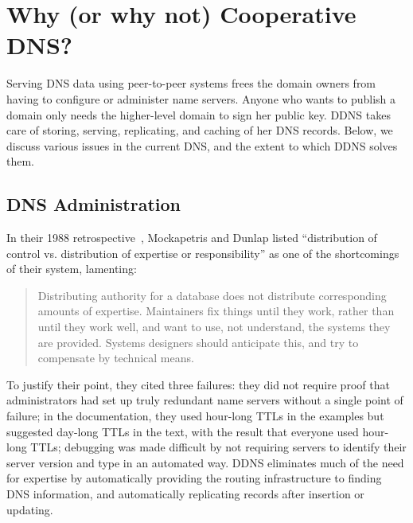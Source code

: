 \section{Why (or why not) Cooperative DNS?}

Serving DNS data using peer-to-peer systems 
frees the domain owners from having to configure
or administer name servers. Anyone who 
wants to publish a domain only needs the higher-level
domain to sign her public key. DDNS takes care of
storing, serving, replicating, and caching of her DNS records.
Below, we discuss various issues in the current DNS, 
and the extent to which DDNS solves them.

\subsection{DNS Administration}

In their 1988 retrospective~\cite{dns}, Mockapetris and Dunlap
listed ``distribution of control vs. distribution of expertise
or responsibility'' as one of the shortcomings of their system,
lamenting:
\begin{quote}
Distributing authority for a database does not distribute
corresponding amounts of expertise.  Maintainers fix things
until they work, rather than until they work well, and want to use,
not understand, the systems they are provided.
Systems designers should anticipate this, and try to
compensate by technical means.
\end{quote}
To justify their point, they cited three failures:
they did not require proof that administrators had set up
truly redundant name servers without a single point of failure;
in the documentation, they used hour-long TTLs 
in the examples but suggested
day-long TTLs in the text, with the result that everyone used
hour-long TTLs; debugging was made difficult by not requiring
servers to identify their server version and type in an automated way.
DDNS eliminates much of the need for expertise by 
automatically providing the routing infrastructure to finding 
DNS information, and automatically replicating records 
after insertion or updating.

